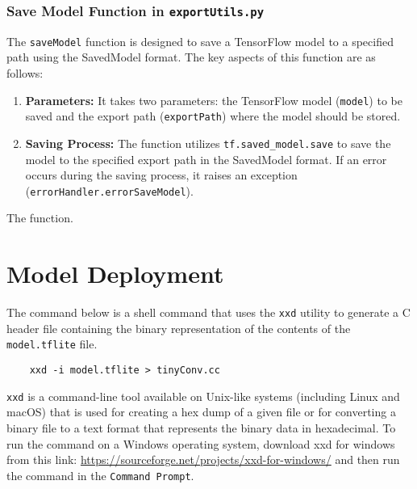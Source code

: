 \subsubsection{Save Model Function in \texttt{exportUtils.py}}

The \texttt{saveModel} function is designed to save a TensorFlow model to a specified path using the SavedModel format. The key aspects of this function are as follows:

\begin{enumerate}
	\item \textbf{Parameters:} It takes two parameters: the TensorFlow model (\texttt{model}) to be saved and the export path (\texttt{exportPath}) where the model should be stored.
	
	\item \textbf{Saving Process:} The function utilizes \texttt{tf.saved\_model.save} to save the model to the specified export path in the SavedModel format. If an error occurs during the saving process, it raises an exception (\texttt{errorHandler.errorSaveModel}).
	
\end{enumerate}

\begin{code}[h!]
	    
	
	\caption{The  function.}
	\label{code:saveModel}
\end{code}


\section{Model Deployment}

The command below is a shell command that uses the \texttt{xxd} utility to generate a C header file containing the binary representation of the contents of the \texttt{model.tflite} file.


\begin{verbatim}
	xxd -i model.tflite > tinyConv.cc
\end{verbatim}

\texttt{xxd} is a command-line tool available on Unix-like systems (including Linux and macOS) that is used for creating a hex dump of a given file or for converting a binary file to a text format that represents the binary data in hexadecimal. To run the command on a Windows operating system, download xxd for windows from this link: \url{https://sourceforge.net/projects/xxd-for-windows/} and then run the command in the \texttt{Command Prompt}.

